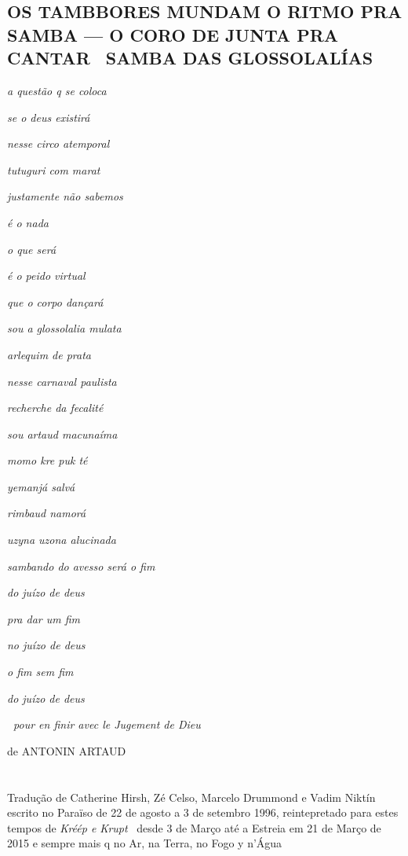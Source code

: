 \pagebreak

\section*{OS TAMBBORES MUNDAM O RITMO PRA SAMBA --- O CORO DE JUNTA PRA
CANTAR ~SAMBA DAS GLOSSOLALÍAS}

\emph{a questão q se coloca}

\emph{se o deus existirá}

\emph{nesse circo atemporal}

\emph{tutuguri com marat}

\emph{justamente não sabemos}

\emph{é o nada}

\emph{o que será}

\emph{é o peido virtual}

\emph{que o corpo dançará}

\emph{sou a glossolalia mulata}

\emph{arlequim de prata}

\emph{nesse carnaval paulista}

\emph{recherche da fecalité}

\emph{sou artaud macunaíma}

\emph{momo kre puk té}

\emph{yemanjá salvá}

\emph{rimbaud namorá}

\emph{uzyna uzona alucinada}

\emph{sambando do avesso será o fim}

\emph{do juízo de deus}

\emph{pra dar um fim}

\emph{no juízo de deus}

\emph{o fim sem fim}

\emph{do juízo de deus}

\textbf{~}\emph{pour en finir avec le Jugement de Dieu}

de ANTONIN ARTAUD

\chapter*{}
\mbox{}\vfill
\begin{flushleft}
Tradução de Catherine Hirsh,
Zé Celso, Marcelo Drummond e Vadim Niktín escrito no Paraïso de 22 de
agosto a 3 de setembro 1996, reintepretado para estes tempos de
\emph{Kréép e Krupt} ~desde 3 de Março até a Estreia em 21 de Março de
2015 e sempre mais q no Ar, na Terra, no Fogo y n'Água
\end{flushleft}
